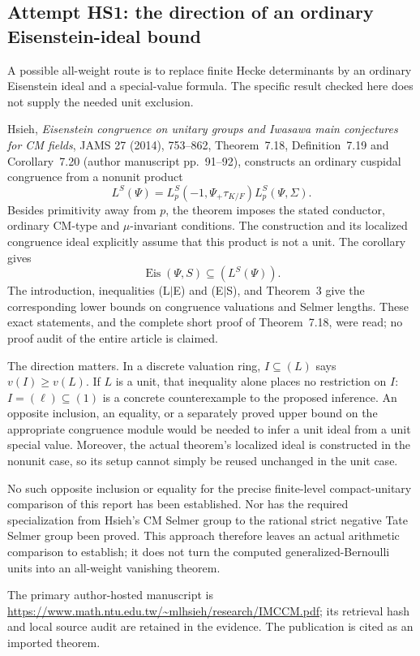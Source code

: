 \subsection{Attempt HS1: the direction of an ordinary Eisenstein-ideal bound}

A possible all-weight route is to replace finite Hecke determinants
by an ordinary Eisenstein ideal and a special-value formula. The
specific result checked here does not supply the needed unit
exclusion.

Hsieh, \emph{Eisenstein congruence on unitary groups and Iwasawa
main conjectures for CM fields}, JAMS 27 (2014), 753--862,
Theorem~7.18, Definition~7.19 and Corollary~7.20
(author manuscript pp.~91--92), constructs an ordinary cuspidal
congruence from a nonunit product
\[
 L^S(\Psi)=L_p^S(-1,\Psi_+\tau_{K/F})L_p^S(\Psi,\Sigma).
\]
Besides primitivity away from $p$, the theorem imposes the
stated conductor, ordinary CM-type and $\mu$-invariant conditions.
The construction and its localized congruence ideal explicitly
assume that this product is not a unit. The corollary gives
\[
                \operatorname{Eis}(\Psi,S)\subseteq(L^S(\Psi)).
\]
The introduction, inequalities (L$\mid$E) and (E$\mid$S),
and Theorem~3 give the corresponding lower bounds on
congruence valuations and Selmer lengths. These exact
statements, and the complete short proof of Theorem~7.18,
were read; no proof audit of the entire article is claimed.

The direction matters. In a discrete valuation ring,
$I\subseteq(L)$ says $v(I)\geq v(L)$. If $L$ is a unit,
that inequality alone places no restriction on $I$:
$I=(\ell)\subseteq(1)$ is a concrete counterexample to
the proposed inference. An opposite inclusion, an equality,
or a separately proved upper bound on the appropriate
congruence module would be needed to infer a unit ideal
from a unit special value. Moreover, the actual theorem's
localized ideal is constructed in the nonunit case, so
its setup cannot simply be reused unchanged in the unit case.

No such opposite inclusion or equality for the precise
finite-level compact-unitary comparison of this report
has been established. Nor has the required specialization
from Hsieh's CM Selmer group to the rational strict negative
Tate Selmer group been proved. This approach therefore leaves
an actual arithmetic comparison to establish; it does not
turn the computed generalized-Bernoulli units into an
all-weight vanishing theorem.

The primary author-hosted manuscript is
\url{https://www.math.ntu.edu.tw/~mlhsieh/research/IMCCM.pdf};
its retrieval hash and local source audit are retained in the
evidence. The publication is cited as an imported theorem.

